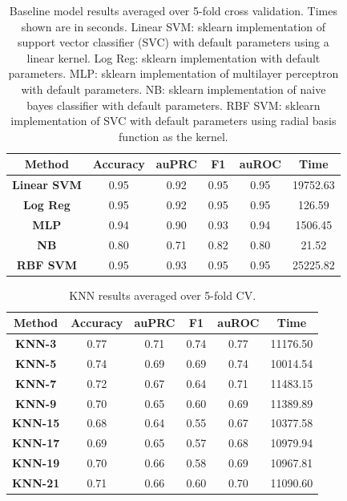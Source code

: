 \documentclass[12pt]{article}
\begin{document}
    \begin{table}[]
    \centering
    \begin{tabular}{|c|c|c|c|c|c|}
    \hline
    \textbf{Method} & \textbf{Accuracy} & \textbf{auPRC} & \textbf{F1} &                             \textbf{auROC} & \textbf{Time} \\ \hline
    \textbf{Linear SVM} & 0.95 & 0.92 & 0.95 & 0.95 & 19752.63 \\ \hline
    \textbf{Log Reg}    & 0.95 & 0.92 & 0.95 & 0.95 & 126.59   \\ \hline
    \textbf{MLP}        & 0.94 & 0.90 & 0.93 & 0.94 & 1506.45  \\ \hline
    \textbf{NB}         & 0.80 & 0.71 & 0.82 & 0.80 & 21.52    \\ \hline
    \textbf{RBF SVM}    & 0.95 & 0.93 & 0.95 & 0.95 & 25225.82 \\ \hline
    \end{tabular}
    \caption{Baseline model results averaged over 5-fold cross validation. Times shown are in seconds. Linear SVM: sklearn implementation of support vector classifier (SVC) with default parameters using a linear kernel. Log Reg: sklearn implementation with default parameters. MLP: sklearn implementation of multilayer perceptron with default parameters. NB: sklearn implementation of naive bayes classifier with default parameters. RBF SVM: sklearn implementation of SVC with default parameters using radial basis function as the kernel.}
    \label{table:2}
    \end{table} 
    
    
    \begin{table}[]
    \centering
\begin{tabular}{|c|c|c|c|c|c|}
\hline
\textbf{Method} & \textbf{Accuracy} & \textbf{auPRC} & \textbf{F1} & \textbf{auROC} & \textbf{Time} \\ \hline
\textbf{KNN-3}  & 0.77 & 0.71 & 0.74 & 0.77 & 11176.50 \\ \hline
\textbf{KNN-5}  & 0.74 & 0.69 & 0.69 & 0.74 & 10014.54 \\ \hline
\textbf{KNN-7}  & 0.72 & 0.67 & 0.64 & 0.71 & 11483.15 \\ \hline
\textbf{KNN-9}  & 0.70 & 0.65 & 0.60 & 0.69 & 11389.89 \\ \hline
\textbf{KNN-15} & 0.68 & 0.64 & 0.55 & 0.67 & 10377.58 \\ \hline
\textbf{KNN-17} & 0.69 & 0.65 & 0.57 & 0.68 & 10979.94 \\ \hline
\textbf{KNN-19} & 0.70 & 0.66 & 0.58 & 0.69 & 10967.81 \\ \hline
\textbf{KNN-21} & 0.71 & 0.66 & 0.60 & 0.70 & 11090.60 \\ \hline
\end{tabular}
\caption{KNN results averaged over 5-fold CV.}
\label{table:3}
\end{table}
    
\end{document}
